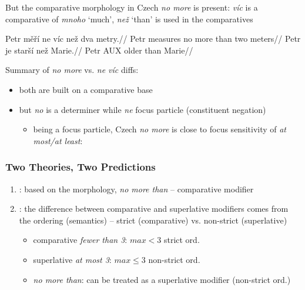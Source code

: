 \documentclass[10pt
]{beamer}
\begin{document}
\begin{frame}

But the comparative morphology in Czech \textit{no more} is present: \textit{víc} is a comparative of \textit{mnoho} `much', \textit{než} `than' is used in the comparatives


\pex \a 
\begingl
\gla Petr měří ne víc než dva metry.//
\glb Petr measures no more than two meters//
\endgl
\a  
\begingl
\gla Petr je starší než Marie.//
\glb Petr AUX older than Marie//
\endgl
\xe

Summary of \textit{no more} vs. \textit{ne víc} diffs: 

\begin{itemize}
  \item both are built on a comparative base
  \item but \textit{no} is a determiner while \textit{ne} focus particle (constituent negation)
  
  \begin{itemize}
    \item being a focus particle, Czech \textit{no more} is close to focus sensitivity of \textit{at most/at least}: \cite{cohen2011superlative,coppock2013raising}
  \end{itemize}

\end{itemize}
 

\end{frame}

\begin{frame}
  \frametitle{Two Theories, Two Predictions}

\begin{enumerate}
  \item \cite{nouwen2008upper,nouwen2010two}: based on the morphology, \textit{no more than} -- comparative modifier
  \item \cite{kennedy2015fregean}: the difference between comparative and superlative modifiers comes from the ordering (semantics) -- strict (comparative) vs. non-strict (superlative)
  \begin{itemize}
    \item comparative \textit{fewer than 3}: $max < 3$ \hfill strict ord.
    \item superlative \textit{at most 3}: $max \leq 3$ \hfill non-strict ord.
    \item \textit{no more than}: can be treated as a superlative modifier (non-strict ord.)
  \end{itemize}
\end{enumerate}  
  

\end{frame}
\end{document}
